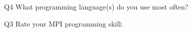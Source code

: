 \begin{description}%
\item{Q4} What programming language(s) do you use most often?%
\item{Q3} Rate your MPI programming skill:%
\end{description}%

